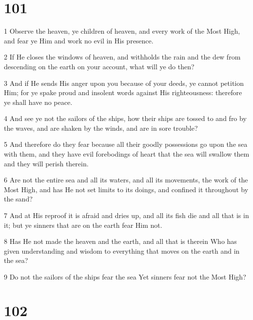 \chapter{101}

\par 1 Observe the heaven, ye children of heaven, and every work of the Most High, and fear ye Him and work no evil in His presence.
\par 2 If He closes the windows of heaven, and withholds the rain and the dew from descending on the earth on your account, what will ye do then?
\par 3 And if He sends His anger upon you because of your deeds, ye cannot petition Him; for ye spake proud and insolent words against His righteousness: therefore ye shall have no peace.
\par 4 And see ye not the sailors of the ships, how their ships are tossed to and fro by the waves, and are shaken by the winds, and are in sore trouble?
\par 5 And therefore do they fear because all their goodly possessions go upon the sea with them, and they have evil forebodings of heart that the sea will swallow them and they will perish therein.
\par 6 Are not the entire sea and all its waters, and all its movements, the work of the Most High, and has He not set limits to its doings, and confined it throughout by the sand?
\par 7 And at His reproof it is afraid and dries up, and all its fish die and all that is in it; but ye sinners that are on the earth fear Him not.
\par 8 Has He not made the heaven and the earth, and all that is therein Who has given understanding and wisdom to everything that moves on the earth and in the sea?
\par 9 Do not the sailors of the ships fear the sea Yet sinners fear not the Most High?

\chapter{102}

